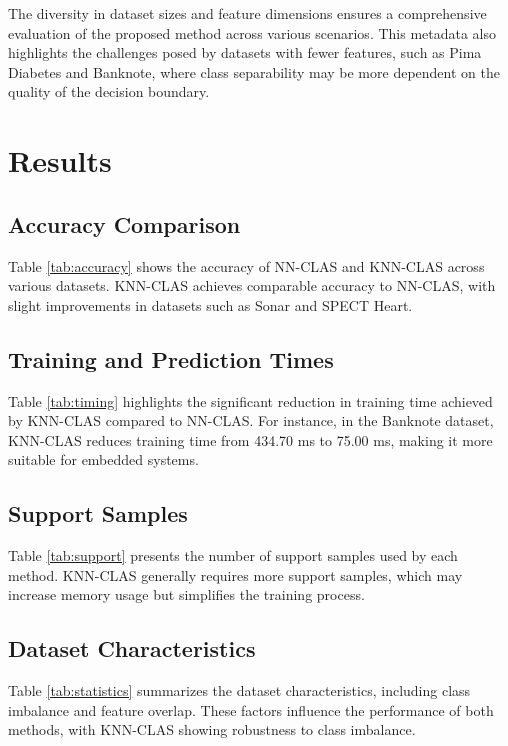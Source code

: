 \documentclass[conference]{IEEEtran}
\begin{document}
The diversity in dataset sizes and feature dimensions ensures a comprehensive evaluation of the proposed method across various scenarios. This metadata also highlights the challenges posed by datasets with fewer features, such as Pima Diabetes and Banknote, where class separability may be more dependent on the quality of the decision boundary.

\section{Results}

\subsection{Accuracy Comparison}

Table \ref{tab:accuracy} shows the accuracy of NN-CLAS and KNN-CLAS across various datasets. KNN-CLAS achieves comparable accuracy to NN-CLAS, with slight improvements in datasets such as Sonar and SPECT Heart.

\subsection{Training and Prediction Times}

Table \ref{tab:timing} highlights the significant reduction in training time achieved by KNN-CLAS compared to NN-CLAS. For instance, in the Banknote dataset, KNN-CLAS reduces training time from 434.70 ms to 75.00 ms, making it more suitable for embedded systems.

\subsection{Support Samples}

Table \ref{tab:support} presents the number of support samples used by each method. KNN-CLAS generally requires more support samples, which may increase memory usage but simplifies the training process.

\subsection{Dataset Characteristics}

Table \ref{tab:statistics} summarizes the dataset characteristics, including class imbalance and feature overlap. These factors influence the performance of both methods, with KNN-CLAS showing robustness to class imbalance.
\end{document}

